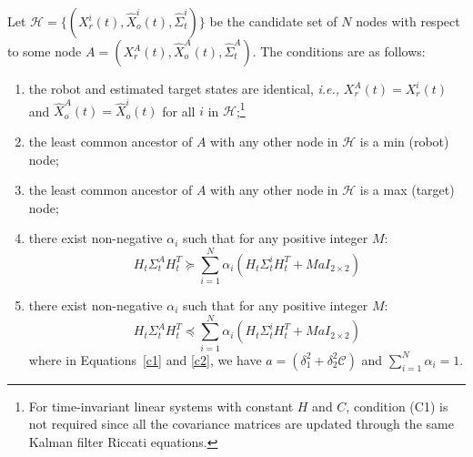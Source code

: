 \documentclass[journal]{IEEEtran}
\newcommand{\ie}{\emph{i.e.,}}
\begin{document}
Let $\mathcal{H} = \{(X^i_r(t),\hat{X}^i_o(t),\hat{\Sigma}^i_t)\}$ be the candidate set of $N$ nodes with respect to some node $A=(X^A_r(t),\hat{X}^A_o(t),\hat{\Sigma}^A_t)$. The conditions are as follows:
\begin{enumerate}[label=(C\arabic*)]
\item the robot and estimated target states are identical, \ie{}  $X^A_r(t)=X^i_r(t)$ and $\hat{X}^A_o(t)=\hat{X}^i_o(t)$ for all $i$ in $\mathcal{H}$;\footnote{For time-invariant linear systems with constant $H$ and $C$, condition (C1) is not required since all the covariance matrices are updated through the same Kalman filter Riccati equations.}
\item the least common ancestor of $A$ with any other node in $\mathcal{H}$ is a min (robot) node;
\item the least common ancestor of $A$ with any other node in $\mathcal{H}$ is a max (target) node;
\item there exist non-negative $\alpha_i$ such that for any positive integer $M$:
\begin{equation}\label{c1}
  H_t\Sigma_t^AH_t^T \succeq   \sum^{N}_{i=1}\alpha_i \left( H_t\Sigma_t^iH_t^T + MaI_{2\times 2}\right)
\end{equation}
\item there exist non-negative $\alpha_i$ such that for any positive integer $M$:
\begin{equation}\label{c2}
  H_t\Sigma_t^AH_t^T \preceq   \sum^{N}_{i=1}\alpha_i \left( H_t\Sigma_t^iH_t^T + MaI_{2\times 2}\right)
\end{equation}
where in Equations~\ref{c1} and \ref{c2}, we have $a=\left(\delta_1^2 +\delta_2^2\mathcal{C}\right)$ and $\sum^{N}_{i=1}\alpha_i =1$.
\end{enumerate}


   
\end{document}
